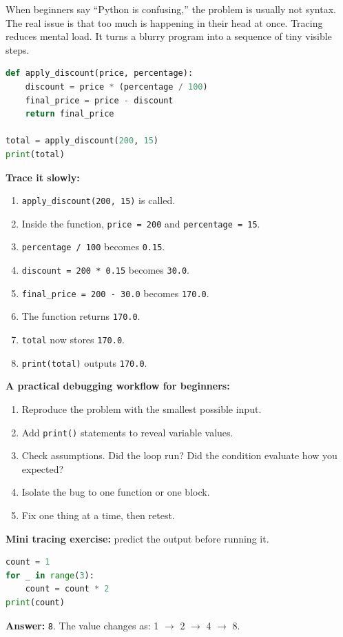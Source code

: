 \documentclass[12pt, a4paper, oneside]{book}
\begin{document}
\begin{intuitionbox}
When beginners say ``Python is confusing,'' the problem is usually not syntax. The real issue is that too much is happening in their head at once. Tracing reduces mental load. It turns a blurry program into a sequence of tiny visible steps.
\end{intuitionbox}

\begin{lstlisting}[language=Python, caption={Tracing a small program}]
def apply_discount(price, percentage):
    discount = price * (percentage / 100)
    final_price = price - discount
    return final_price

total = apply_discount(200, 15)
print(total)
\end{lstlisting}

\textbf{Trace it slowly:}
\begin{enumerate}[leftmargin=2em]
    \item \texttt{apply\_discount(200, 15)} is called.
    \item Inside the function, \texttt{price = 200} and \texttt{percentage = 15}.
    \item \texttt{percentage / 100} becomes \texttt{0.15}.
    \item \texttt{discount = 200 * 0.15} becomes \texttt{30.0}.
    \item \texttt{final\_price = 200 - 30.0} becomes \texttt{170.0}.
    \item The function returns \texttt{170.0}.
    \item \texttt{total} now stores \texttt{170.0}.
    \item \texttt{print(total)} outputs \texttt{170.0}.
\end{enumerate}

\textbf{A practical debugging workflow for beginners:}
\begin{enumerate}[leftmargin=2em]
    \item Reproduce the problem with the smallest possible input.
    \item Add \texttt{print()} statements to reveal variable values.
    \item Check assumptions. Did the loop run? Did the condition evaluate how you expected?
    \item Isolate the bug to one function or one block.
    \item Fix one thing at a time, then retest.
\end{enumerate}

\begin{exercisebox}
\textbf{Mini tracing exercise:} predict the output before running it.
\begin{lstlisting}[language=Python]
count = 1
for _ in range(3):
    count = count * 2
print(count)
\end{lstlisting}
\textbf{Answer:} \texttt{8}. The value changes as: 1 $\to$ 2 $\to$ 4 $\to$ 8.
\end{exercisebox}
\end{document}
